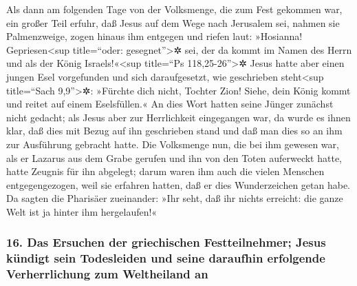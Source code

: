  Als dann am folgenden Tage von der Volksmenge, die zum
Fest gekommen war, ein großer Teil erfuhr, daß Jesus auf dem Wege nach
Jerusalem sei,  nahmen sie Palmenzweige, zogen hinaus ihm
entgegen und riefen laut: »Hosianna! Gepriesen\textless sup
title=``oder: gesegnet''\textgreater✲ sei, der da kommt im Namen des
Herrn und als der König Israels!«\textless sup title=``Ps
118,25-26''\textgreater✲  Jesus hatte aber einen jungen
Esel vorgefunden und sich daraufgesetzt, wie geschrieben
steht\textless sup title=``Sach 9,9''\textgreater✲: 
»Fürchte dich nicht, Tochter Zion! Siehe, dein König kommt und reitet
auf einem Eselsfüllen.«  An dies Wort hatten seine Jünger
zunächst nicht gedacht; als Jesus aber zur Herrlichkeit eingegangen war,
da wurde es ihnen klar, daß dies mit Bezug auf ihn geschrieben stand und
daß man dies so an ihm zur Ausführung gebracht hatte. 
Die Volksmenge nun, die bei ihm gewesen war, als er Lazarus aus dem
Grabe gerufen und ihn von den Toten auferweckt hatte, hatte Zeugnis für
ihn abgelegt;  darum waren ihm auch die vielen Menschen
entgegengezogen, weil sie erfahren hatten, daß er dies Wunderzeichen
getan habe.  Da sagten die Pharisäer zueinander: »Ihr
seht, daß ihr nichts erreicht: die ganze Welt ist ja hinter ihm
hergelaufen!«

\hypertarget{das-ersuchen-der-griechischen-festteilnehmer-jesus-kuxfcndigt-sein-todesleiden-und-seine-daraufhin-erfolgende-verherrlichung-zum-weltheiland-an}{%
\subsubsection{16. Das Ersuchen der griechischen Festteilnehmer; Jesus
kündigt sein Todesleiden und seine daraufhin erfolgende Verherrlichung
zum Weltheiland
an}\label{das-ersuchen-der-griechischen-festteilnehmer-jesus-kuxfcndigt-sein-todesleiden-und-seine-daraufhin-erfolgende-verherrlichung-zum-weltheiland-an}}

